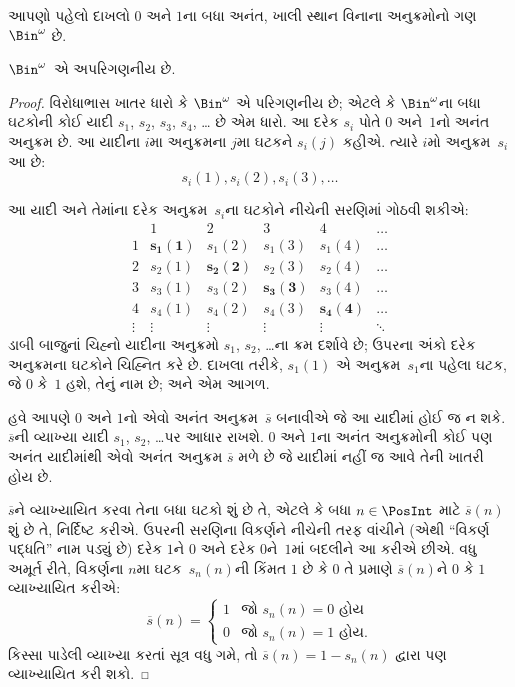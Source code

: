 આપણો પહેલો દાખલો $0$ અને $1$ના બધા અનંત, ખાલી સ્થાન વિનાના
અનુક્રમોનો ગણ~$\Bin^\omega$ છે.

\begin{thm}
$\Bin^\omega$~એ અપરિગણનીય છે.
\end{thm}

\begin{proof}
વિરોધાભાસ ખાતર ધારો કે $\Bin^\omega$ એ પરિગણનીય છે;
એટલે કે $\Bin^\omega$ના બધા ઘટકોની કોઈ યાદી
$s_{1}$, $s_{2}$, $s_{3}$, $s_{4}$, \dots{} છે એમ ધારો.
આ દરેક $s_i$ પોતે $0$ અને~$1$નો અનંત અનુક્રમ છે.
આ યાદીના $i$મા અનુક્રમના $j$મા ઘટકને $s_i(j)$ કહીએ.
ત્યારે $i$મો અનુક્રમ~$s_i$ આ છે:
\[
s_i(1), s_i(2), s_i(3), \dots
\]

આ યાદી અને તેમાંના દરેક અનુક્રમ~$s_i$ના ઘટકોને નીચેની
સરણિમાં ગોઠવી શકીએ:
\[
\begin{array}{c|c|c|c|c|c}
& 1 & 2 & 3 & 4 & \dots \\\hline
1 & \mathbf{s_{1}(1)} & s_{1}(2) & s_{1}(3) & s_1(4) & \dots \\\hline
2 & s_{2}(1)& \mathbf{s_{2}(2)} & s_2(3) & s_2(4) & \dots \\\hline
3 & s_{3}(1)& s_{3}(2) & \mathbf{s_3(3)} & s_3(4) & \dots \\\hline
4 & s_{4}(1)& s_{4}(2) & s_4(3) & \mathbf{s_4(4)} & \dots \\\hline
\vdots & \vdots & \vdots & \vdots & \vdots & \mathbf{\ddots}
\end{array}
\]
ડાબી બાજુનાં ચિહ્નો યાદીના અનુક્રમો $s_1$, $s_2$, \dots{}ના
ક્રમ દર્શાવે છે; ઉપરના અંકો દરેક અનુક્રમના ઘટકોને
ચિહ્નિત કરે છે. દાખલા તરીકે, $s_{1}(1)$ એ અનુક્રમ~$s_{1}$ના
પહેલા ઘટક, જે $0$ કે~$1$ હશે, તેનું નામ છે; અને એમ આગળ.

હવે આપણે $0$ અને $1$નો એવો અનંત અનુક્રમ~$\overline{s}$ બનાવીએ
જે આ યાદીમાં હોઈ જ ન શકે. $\overline{s}$ની વ્યાખ્યા યાદી
$s_1$, $s_2$, \dots પર આધાર રાખશે. $0$ અને $1$ના અનંત
અનુક્રમોની કોઈ પણ અનંત યાદીમાંથી એવો અનંત અનુક્રમ
$\overline{s}$ મળે છે જે યાદીમાં નહીં જ આવે તેની ખાતરી હોય છે.

$\overline{s}$ને વ્યાખ્યાયિત કરવા તેના બધા ઘટકો શું છે તે,
એટલે કે બધા $n \in \PosInt$ માટે $\overline{s}(n)$ શું છે તે,
નિર્દિષ્ટ કરીએ. ઉપરની સરણિના વિકર્ણને નીચેની તરફ વાંચીને
(એથી ``વિકર્ણ પદ્ધતિ'' નામ પડ્યું છે) દરેક $1$ને $0$ અને દરેક
$0$ને~$1$માં બદલીને આ કરીએ છીએ. વધુ અમૂર્ત રીતે,
વિકર્ણના $n$મા ઘટક~$s_n(n)$ની કિંમત $1$ છે કે $0$
તે પ્રમાણે $\overline{s}(n)$ને $0$ કે $1$ વ્યાખ્યાયિત કરીએ:
\[
\overline{s}(n) =
\begin{cases}
1 & \text{જો $s_{n}(n) = 0$ હોય}\\
0 & \text{જો $s_{n}(n) = 1$ હોય}.
\end{cases}
\]
કિસ્સા પાડેલી વ્યાખ્યા કરતાં સૂત્ર વધુ ગમે, તો
$\overline{s}(n) = 1 - s_n(n)$ દ્વારા પણ વ્યાખ્યાયિત કરી શકો.


\end{proof}
